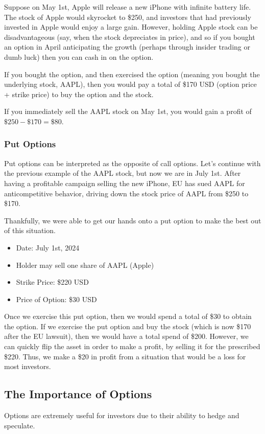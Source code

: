 \documentclass{article}
\begin{document}
Suppose on May 1st, Apple will release a new iPhone with infinite battery life. 
The stock of Apple would skyrocket to \$250, and investors that had previously invested in Apple would enjoy a large gain.
However, holding Apple stock can be disadvantageous (say, when the stock depreciates in price), 
and so if you bought an option in April anticipating the growth (perhaps through insider trading or dumb luck)
then you can cash in on the option.

If you bought the option, and then exercised the option (meaning you bought the underlying stock, AAPL), 
then you would pay a total of \$170 USD (option price + strike price) to buy the option and the stock.

If you immediately sell the AAPL stock on May 1st, you would gain a profit of $\$250-\$170 = \$80$. 

\subsubsection*{Put Options}
Put options can be interpreted as the opposite of call options. Let's continue with the previous example of the AAPL stock,
but now we are in July 1st. After having a profitable campaign selling the new iPhone, EU has sued AAPL for anticompetitive behavior, 
driving down the stock price of AAPL from \$250 to \$170. 

Thankfully, we were able to get our hands onto a put option to make the best out of this situation.
\begin{itemize}
\item Date: July 1st, 2024
\item Holder may sell one share of AAPL (Apple)
\item Strike Price: \$220 USD
\item Price of Option: \$30 USD
\end{itemize}

Once we exercise this put option, then we would spend a total of \$30 
to obtain the option. If we exercise the put option and buy the stock (which is now \$170 after the EU lawsuit),
then we would have a total spend of \$200. However, we can quickly flip the asset in order to make a profit, by selling it for the prescribed \$220. 
Thus, we make a \$20 in profit from a situation that would be a loss for most investors.


\subsection*{The Importance of Options}
Options are extremely useful for investors due to their ability to hedge and speculate. 
\end{document}
